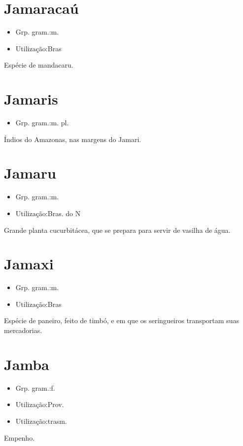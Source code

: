\documentclass{article}
\begin{document}
\section{Jamaracaú}
\begin{itemize}
\item {Grp. gram.:m.}
\end{itemize}
\begin{itemize}
\item {Utilização:Bras}
\end{itemize}
Espécie de mandacaru.
\section{Jamaris}
\begin{itemize}
\item {Grp. gram.:m. pl.}
\end{itemize}
Índios do Amazonas, nas margens do Jamari.
\section{Jamaru}
\begin{itemize}
\item {Grp. gram.:m.}
\end{itemize}
\begin{itemize}
\item {Utilização:Bras. do N}
\end{itemize}
Grande planta cucurbitácea, que se prepara para servir de vasilha de água.
\section{Jamaxi}
\begin{itemize}
\item {Grp. gram.:m.}
\end{itemize}
\begin{itemize}
\item {Utilização:Bras}
\end{itemize}
Espécie de paneiro, feito de timbó, e em que os seringueiros transportam suas mercadorias.
\section{Jamba}
\begin{itemize}
\item {Grp. gram.:f.}
\end{itemize}
\begin{itemize}
\item {Utilização:Prov.}
\end{itemize}
\begin{itemize}
\item {Utilização:trasm.}
\end{itemize}
Empenho.
\end{document}
